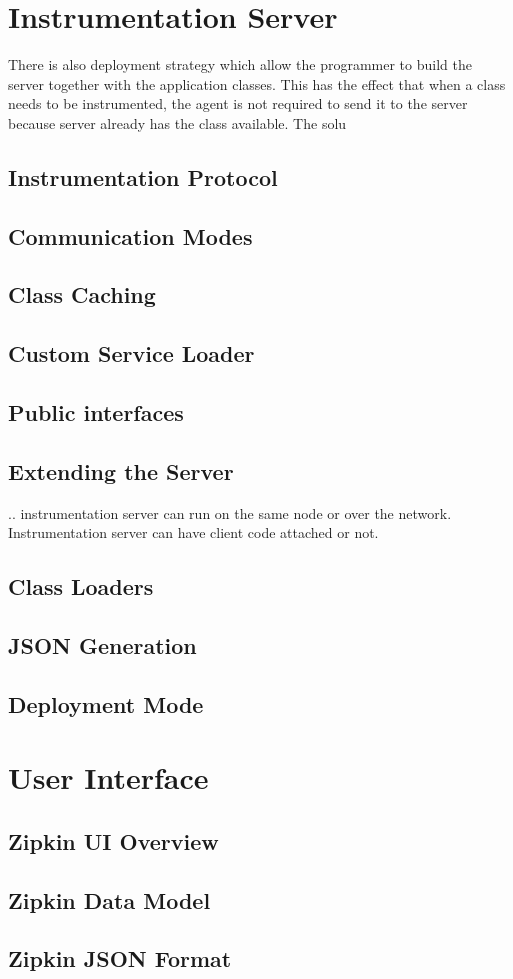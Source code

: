 \section{Instrumentation Server}
 There is also deployment strategy which allow the programmer to build the server together with the application classes. This has the effect that when a class needs to be instrumented, the agent is not required to send it to the server because server already has the class available. The solu
\subsection{Instrumentation Protocol}
\subsection{Communication Modes}
\subsection{Class Caching}
\subsection{Custom Service Loader}
\subsection{Public interfaces}
\subsection{Extending the Server}
.. instrumentation server can run on the same node or over the network. Instrumentation server can have client code attached or not.
\subsection{Class Loaders}
\subsection{JSON Generation}
\subsection{Deployment Mode}
\label{sec:deploy_mode}
\section{User Interface}
\label{sec:zipkin_ui}
\subsection{Zipkin UI Overview}
\subsection{Zipkin Data Model}
\subsection{Zipkin JSON Format}
